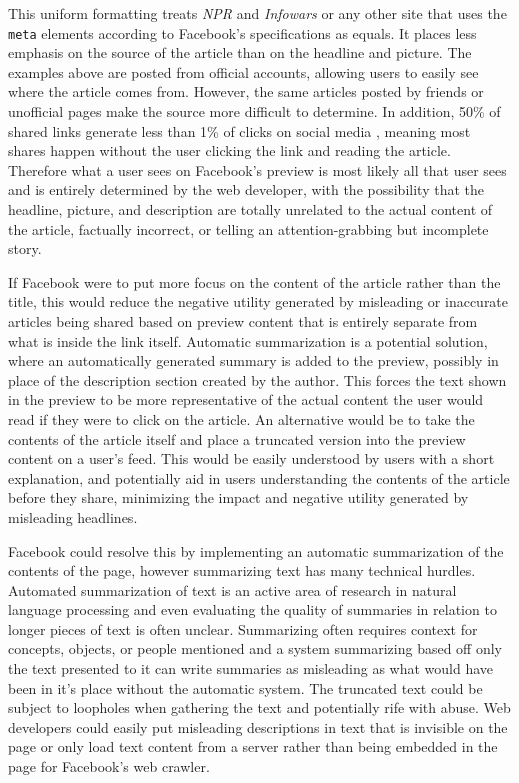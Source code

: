 \documentclass[12pt]{article}
\begin{document}
This uniform formatting treats {\it NPR} and {\it Infowars} or any other site that uses the \texttt{meta} elements according to Facebook's specifications as equals. It places less emphasis on the source of the article than on the headline and picture. The examples above are posted from official accounts, allowing users to easily see where the article comes from. However, the same articles posted by friends or unofficial pages make the source more difficult to determine. In addition, 50\% of shared links generate less than 1\% of clicks on social media \citep{clicks_vs_shares}, meaning most shares happen without the user clicking the link and reading the article. Therefore what a user sees on Facebook's preview is most likely all that user sees and is entirely determined by the web developer, with the possibility that the headline, picture, and description are totally unrelated to the actual content of the article, factually incorrect, or telling an attention-grabbing but incomplete story.

If Facebook were to put more focus on the content of the article rather than the title, this would reduce the negative utility generated by misleading or inaccurate articles being shared based on preview content that is entirely separate from what is inside the link itself. Automatic summarization is a potential solution, where an automatically generated summary is added to the preview, possibly in place of the description section created by the author. This forces the text shown in the preview to be more representative of the actual content the user would read if they were to click on the article. An alternative would be to take the contents of the article itself and place a truncated version into the preview content on a user's feed. This would be easily understood by users with a short explanation, and potentially aid in users understanding the contents of the article before they share, minimizing the impact and negative utility generated by misleading headlines.

Facebook could resolve this by implementing an automatic summarization of the contents of the page, however summarizing text has many technical hurdles. Automated summarization of text is an active area of research in natural language processing and even evaluating the quality of summaries in relation to longer pieces of text is often unclear. Summarizing often requires context for concepts, objects, or people mentioned and a system summarizing based off only the text presented to it can write summaries as misleading as what would have been in it's place without the automatic system. The truncated text could be subject to loopholes when gathering the text and potentially rife with abuse. Web developers could easily put misleading descriptions in text that is invisible on the page or only load text content from a server rather than being embedded in the page for Facebook's web crawler.
\end{document}
